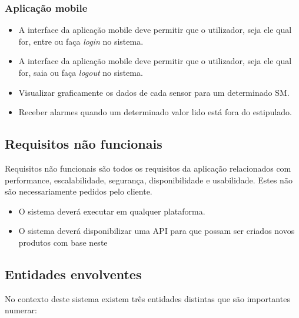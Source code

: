 \subsubsection{Aplicação mobile}



\begin{itemize}
	\item A interface da aplicação mobile deve permitir que o utilizador, seja ele qual for, entre ou faça \textit{login} no sistema. 
	
	\item A interface da aplicação mobile deve permitir que o utilizador, seja ele qual for, saia ou faça \textit{logout} no sistema.
	
	
	\item Visualizar graficamente os dados de cada sensor para um determinado \ac{SM}. 
	
	\item Receber alarmes quando um determinado valor lido está fora do estipulado.
	
	
\end{itemize}



\subsection{Requisitos não funcionais}


Requisitos não funcionais são todos os requisitos da aplicação relacionados com
performance, escalabilidade, segurança, disponibilidade e usabilidade. Estes não são
necessariamente pedidos pelo cliente. 


\begin{itemize}
	\item O sistema deverá executar em qualquer plataforma.
	
	\item O sistema deverá disponibilizar uma API para que possam ser criados novos produtos com base neste 
 
	
\end{itemize}








\subsection{Entidades envolventes}


No contexto deste sistema existem três entidades distintas que são importantes numerar: 

